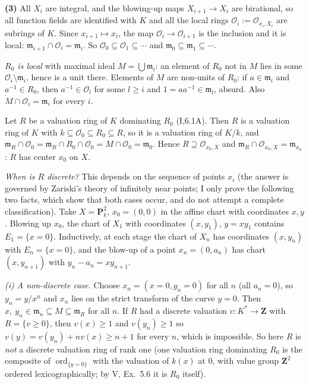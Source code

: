 \documentclass[11pt]{article}
\begin{document}
\textbf{(3)} All $X_i$ are integral, and the blowing-up maps $X_{i+1}\to X_i$ are birational, so all function fields are identified with $K$ and all the local rings $\mathcal O_i:=\mathcal O_{x_i,X_i}$ are subrings of $K$. Since $x_{i+1}\mapsto x_i$, the map $\mathcal O_i\to\mathcal O_{i+1}$ is the inclusion and it is local: $\mathfrak m_{i+1}\cap\mathcal O_i=\mathfrak m_i$. So $\mathcal O_0\subseteq\mathcal O_1\subseteq\cdots$ and $\mathfrak m_0\subseteq\mathfrak m_1\subseteq\cdots$.

\emph{$R_0$ is local} with maximal ideal $M=\bigcup\mathfrak m_i$: an element of $R_0$ not in $M$ lies in some $\mathcal O_i\setminus\mathfrak m_i$, hence is a unit there. Elements of $M$ are non-units of $R_0$: if $a\in\mathfrak m_i$ and $a^{-1}\in R_0$, then $a^{-1}\in\mathcal O_l$ for some $l\ge i$ and $1=aa^{-1}\in\mathfrak m_l$, absurd. Also $M\cap\mathcal O_i=\mathfrak m_i$ for every $i$.

Let $R$ be a valuation ring of $K$ dominating $R_0$ (I,6.1A). Then $R$ is a valuation ring of $K$ with $k\subseteq\mathcal O_0\subseteq R_0\subseteq R$, so it is a valuation ring of $K/k$, and $\mathfrak m_R\cap\mathcal O_0=\mathfrak m_R\cap R_0\cap\mathcal O_0=M\cap\mathcal O_0=\mathfrak m_0$. Hence $R\supseteq\mathcal O_{x_0,X}$ and $\mathfrak m_R\cap\mathcal O_{x_0,X}=\mathfrak m_{x_0}$: $R$ has center $x_0$ on $X$.

\emph{When is $R$ discrete?} This depends on the sequence of points $x_i$ (the answer is governed by Zariski's theory of infinitely near points; I only prove the following two facts, which show that both cases occur, and do not attempt a complete classification). Take $X=\mathbf P^2_k$, $x_0=(0,0)$ in the affine chart with coordinates $x,y$. Blowing up $x_0$, the chart of $X_1$ with coordinates $(x,y_1)$, $y=xy_1$ contains $E_1=\{x=0\}$. Inductively, at each stage the chart of $X_n$ has coordinates $(x,y_n)$ with $E_n=\{x=0\}$, and the blow-up of a point $x_n=(0,a_n)$ has chart $(x,y_{n+1})$ with $y_n-a_n=xy_{n+1}$.

\emph{(i) A non-discrete case.} Choose $x_n=(x=0,y_n=0)$ for all $n$ (all $a_n=0$), so $y_n=y/x^n$ and $x_n$ lies on the strict transform of the curve $y=0$. Then $x,\ y_n\in\mathfrak m_n\subseteq M\subseteq\mathfrak m_R$ for all $n$. If $R$ had a discrete valuation $v:K^*\to\mathbf Z$ with $R=\{v\ge0\}$, then $v(x)\ge1$ and $v(y_n)\ge1$ so $v(y)=v(y_n)+nv(x)\ge n+1$ for every $n$, which is impossible. So here $R$ is \emph{not} a discrete valuation ring of rank one (one valuation ring dominating $R_0$ is the composite of $\operatorname{ord}_{\{y=0\}}$ with the valuation of $k(x)$ at $0$, with value group $\mathbf Z^2$ ordered lexicographically; by V, Ex.~5.6 it is $R_0$ itself).
\end{document}
